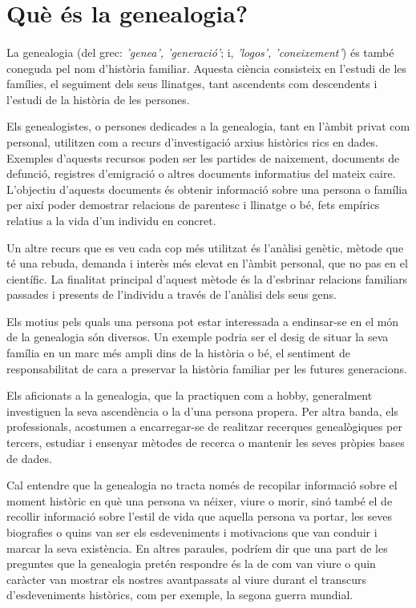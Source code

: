\section{Què és la genealogia?}

    \paragraph{}
    La \gls{genealogia} (del grec:  \emph{'genea', 'generació'}; i, \emph{'logos', 'coneixement'}) és també coneguda pel nom d’història familiar. Aquesta ciència consisteix en l’estudi de les famílies, el seguiment dels seus llinatges, tant ascendents com descendents i l’estudi de la història de les persones.

    Els genealogistes, o persones dedicades a la genealogia, tant en l’àmbit privat com personal, utilitzen com a recurs d’investigació arxius històrics rics en dades. Exemples d'aquests recursos poden ser les partides de naixement, documents de defunció, registres d’emigració o altres documents informatius del mateix caire.  L'objectiu d'aquests documents és obtenir informació sobre una persona o família per així poder demostrar relacions de parentesc i llinatge o bé, fets empírics relatius a la vida d'un individu en concret.

    Un altre recurs que es veu cada cop més utilitzat és l'anàlisi genètic, mètode que té una rebuda, demanda i interès més elevat en l’àmbit personal, que no pas en el científic. La finalitat principal d'aquest mètode és la d'esbrinar relacions familiars passades i presents de l'individu a través de l'anàlisi dels seus gens.

    Els motius pels quals una persona pot estar interessada a endinsar-se en el món de la genealogia són diversos. Un exemple podria ser el desig de situar la seva família en un marc més ampli dins de la història o bé, el sentiment de responsabilitat de cara a preservar la història familiar per les futures generacions.

    Els aficionats a la genealogia, que la practiquen com a hobby, generalment investiguen la seva ascendència o la d’una persona propera. Per altra banda, els professionals, acostumen a encarregar-se de realitzar recerques genealògiques per tercers, estudiar i ensenyar mètodes de recerca o mantenir les seves pròpies bases de dades.

    Cal entendre que la genealogia no tracta només de recopilar informació sobre el moment històric en què una persona va néixer, viure o morir, sinó també el de recollir informació sobre l'estil de vida que aquella persona va portar, les seves biografies o quins van ser els esdeveniments i motivacions que van conduir i marcar la seva existència. En altres paraules, podríem dir que una part de les preguntes que la genealogia pretén respondre és la de com van viure o quin caràcter van mostrar els nostres avantpassats al viure durant el transcurs d'esdeveniments històrics, com per exemple, la segona guerra mundial.

